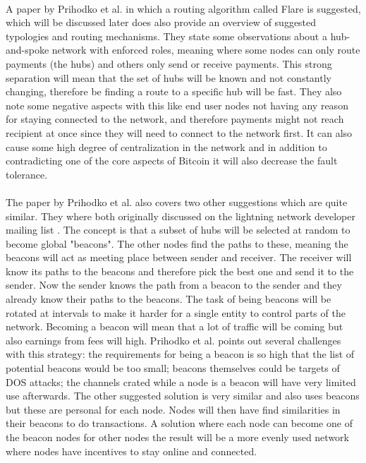 \documentclass[informationsecurity]{gucmasterproject}
\begin{document}
\paragraph{} 
A paper by Prihodko et al. in which a routing algorithm called Flare\cite{prihodko2016flare} is suggested, which will be discussed later does also provide an overview of suggested typologies and routing mechanisms. They state some observations about a hub-and-spoke network with enforced roles, meaning where some nodes can only route payments (the hubs) and others only send or receive payments. This strong separation will mean that the set of hubs will be known and not constantly changing, therefore be finding a route to a specific hub will be fast. They also note some negative aspects with this like 
end user nodes not having any reason for staying connected to the network, and therefore payments might not reach recipient at once since they will need to connect to the network first.
It can also cause some high degree of centralization in the network and in addition to contradicting one of the core aspects of Bitcoin it will also decrease the fault tolerance.

\paragraph{}
The  paper by Prihodko et al.\cite{prihodko2016flare} also covers two other suggestions which are quite similar.
They where both originally discussed on the lightning network developer mailing list\cite{rusty_routing1} \cite{rusty_routing2} \cite{rusty_routing3}. The concept is that a subset of hubs will be selected at random to become global "beacons". The other nodes find the paths to these, meaning the beacons will act as meeting place between sender and receiver. The receiver will know its paths to the beacons and therefore pick the best one and send it to the sender. Now the sender knows the path from a beacon to the sender and they already know their paths to the beacons. The task of being beacons will be rotated at intervals to make it harder for a single entity to control parts of the network. Becoming a beacon will mean that a lot of traffic will be coming but also earnings from fees will high.
Prihodko et al.\cite{prihodko2016flare} points out several challenges with this strategy: the requirements for being a beacon is so high that the list of potential beacons would be too small; beacons themselves could be targets of DOS attacks; the channels crated while a node is a beacon will have very limited use afterwards. The other suggested solution is very similar and also uses beacons but these are personal for each node. Nodes will then have find similarities in their beacons to do transactions. A solution where each node can become one of the beacon nodes for other nodes the result will be a more evenly used network where nodes have incentives to stay online and connected.
\end{document}
